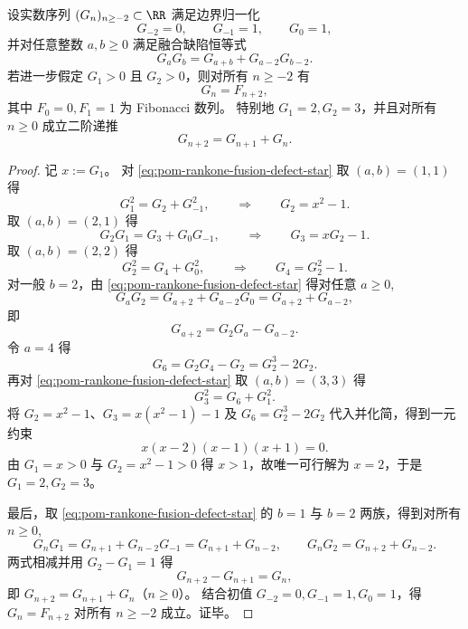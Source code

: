 \begin{theorem}\label{thm:pom-rankone-fusion-defect-fibonacci-rigidity}
设实数序列 \((G_n)_{n\ge -2}\subset\RR\) 满足边界归一化
\[
G_{-2}=0,\qquad G_{-1}=1,\qquad G_0=1,
\]
并对任意整数 \(a,b\ge 0\) 满足融合缺陷恒等式
\begin{equation}\label{eq:pom-rankone-fusion-defect-star}
\boxed{\;
G_aG_b=G_{a+b}+G_{a-2}G_{b-2}.\;}
\end{equation}
若进一步假定 \(G_1>0\) 且 \(G_2>0\)，则对所有 \(n\ge -2\) 有
\[
G_n=F_{n+2},
\]
其中 \(F_0=0,F_1=1\) 为 Fibonacci 数列。
特别地 \(G_1=2,G_2=3\)，并且对所有 \(n\ge 0\) 成立二阶递推
\[
G_{n+2}=G_{n+1}+G_n.
\]
\end{theorem}
\begin{proof}
记 \(x:=G_1\)。
对 \eqref{eq:pom-rankone-fusion-defect-star} 取 \((a,b)=(1,1)\) 得
\[
G_1^2=G_2+G_{-1}^2,
\qquad\Longrightarrow\qquad
G_2=x^2-1.
\]
取 \((a,b)=(2,1)\) 得
\[
G_2G_1=G_3+G_0G_{-1},
\qquad\Longrightarrow\qquad
G_3=xG_2-1.
\]
取 \((a,b)=(2,2)\) 得
\[
G_2^2=G_4+G_0^2,
\qquad\Longrightarrow\qquad
G_4=G_2^2-1.
\]
对一般 \(b=2\)，由 \eqref{eq:pom-rankone-fusion-defect-star} 得对任意 \(a\ge 0\),
\[
G_aG_2=G_{a+2}+G_{a-2}G_0=G_{a+2}+G_{a-2},
\]
即
\begin{equation}\label{eq:pom-rankone-fusion-defect-rec-b2}
G_{a+2}=G_2G_a-G_{a-2}.
\end{equation}
令 \(a=4\) 得
\[
G_6=G_2G_4-G_2=G_2^3-2G_2.
\]
再对 \eqref{eq:pom-rankone-fusion-defect-star} 取 \((a,b)=(3,3)\) 得
\[
G_3^2=G_6+G_1^2.
\]
将 \(G_2=x^2-1\)、\(G_3=x(x^2-1)-1\) 及 \(G_6=G_2^3-2G_2\) 代入并化简，得到一元约束
\[
x(x-2)(x-1)(x+1)=0.
\]
由 \(G_1=x>0\) 与 \(G_2=x^2-1>0\) 得 \(x>1\)，故唯一可行解为 \(x=2\)，于是 \(G_1=2,G_2=3\)。

最后，取 \eqref{eq:pom-rankone-fusion-defect-star} 的 \(b=1\) 与 \(b=2\) 两族，得到对所有 \(n\ge 0\),
\[
G_nG_1=G_{n+1}+G_{n-2}G_{-1}=G_{n+1}+G_{n-2},
\qquad
G_nG_2=G_{n+2}+G_{n-2}.
\]
两式相减并用 \(G_2-G_1=1\) 得
\[
G_{n+2}-G_{n+1}=G_n,
\]
即 \(G_{n+2}=G_{n+1}+G_n\)（\(n\ge 0\)）。
结合初值 \(G_{-2}=0,G_{-1}=1,G_0=1\)，得 \(G_n=F_{n+2}\) 对所有 \(n\ge -2\) 成立。证毕。
\end{proof}

